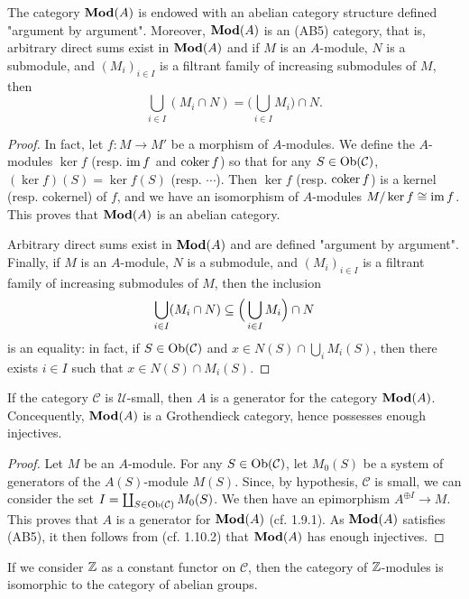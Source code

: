 \begin{proposition}\label{category presheaf Mod(A) is AB5 category}
The category $\mathbf{Mod}(A)$ is endowed with an abelian category structure defined "argument by argument". Moreover, $\mathbf{Mod}(A)$ is an (AB5) category, that is, arbitrary direct sums exist in $\mathbf{Mod}(A)$ and if $M$ is an $A$-module, $N$ is a submodule, and $(M_i)_{i\in I}$ is a filtrant family of increasing submodules of $M$, then
\[\bigcup_{i\in I}(M_i\cap N)=\Big(\bigcup_{i\in I}M_i\Big)\cap N.\]
\end{proposition}
\begin{proof}
In fact, let $f:M\to M'$ be a morphism of $A$-modules. We define the $A$-modules $\ker f$ (resp. $\operatorname{im} f$ and $\operatorname{coker} f$) so that for any $S\in\mathrm{Ob}(\mathcal{C})$, $(\ker f)(S)=\ker f(S)$ (resp. $\cdots$). Then $\ker f$ (resp. $\operatorname{coker} f$) is a kernel (resp. cokernel) of $f$, and we have an isomorphism of $A$-modules $M/\operatorname{ker} f\cong\operatorname{im} f$. This proves that $\mathbf{Mod}(A)$ is an abelian category.\par
Arbitrary direct sums exist in $\mathbf{Mod}(A)$ and are defined "argument by argument". Finally, if $M$ is an $A$-module, $N$ is a submodule, and $(M_i)_{i\in I}$ is a filtrant family of increasing submodules of $M$, then the inclusion
\[\bigcup_{i\in I}(M_i\cap N)\subseteq \Big(\bigcup_{i\in I}M_i\Big)\cap N\]
is an equality: in fact, if $S\in\mathrm{Ob}(\mathcal{C})$ and $x\in N(S)\cap\bigcup_iM_i(S)$, then there exists $i\in I$ such that $x\in N(S)\cap M_i(S)$.
\end{proof}

\begin{proposition}\label{category presheaf Mod(A) generator if small}
If the category $\mathcal{C}$ is $\mathscr{U}$-small, then $A$ is a generator for the category $\mathbf{Mod}(A)$. Concequently, $\mathbf{Mod}(A)$ is a Grothendieck category, hence possesses enough injectives.
\end{proposition}
\begin{proof}
Let $M$ be an $A$-module. For any $S\in\mathrm{Ob}(\mathcal{C})$, let $M_0(S)$ be a system of generators of the $A(S)$-module $M(S)$. Since, by hypothesis, $\mathcal{C}$ is small, we can consider the set $I=\coprod_{S\in\mathrm{Ob}(\mathcal{C})}M_0(S)$. We then have an epimorphism $A^{\oplus I}\to M$. This proves that $A$ is a generator for $\mathbf{Mod}(A)$ (cf. \cite{tohoku} 1.9.1). As $\mathbf{Mod}(A)$ satisfies (AB5), it then follows from (cf. \cite{tohoku} 1.10.2) that $\mathbf{Mod}(A)$ has enough injectives.
\end{proof}

\begin{remark}
If we consider $\mathbb{Z}$ as a constant functor on $\mathcal{C}$, then the category of $\mathbb{Z}$-modules is isomorphic to the category of abelian groups.
\end{remark}

